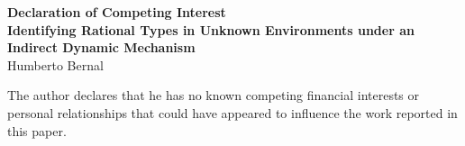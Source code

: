 \documentclass[12pt]{article}
\begin{document}
\doublespacing

\begin{center}
\textbf{Declaration of Competing Interest} \\
\vspace{1em}
\textbf{Identifying Rational Types in Unknown Environments under an Indirect Dynamic Mechanism} \\
Humberto Bernal
\end{center}

\vspace{2em}

\noindent The author declares that he has no known competing financial interests or personal relationships that could have appeared to influence the work reported in this paper.
\end{document}
